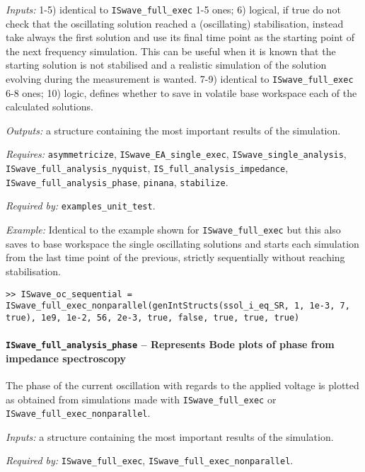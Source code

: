	\textit{Inputs:} 1-5) identical to \texttt{IS\-wave\_full\_exec} 1-5 ones;
	6) logical, if true do not check that the oscillating solution reached a
	(oscillating) stabilisation, instead take always the first solution
	and use its final time point as the starting point of the next
	frequency simulation. This can be useful when it is known that the
	starting solution is not stabilised and a realistic simulation of the
	solution evolving during the measurement is wanted.
	7-9) identical to \texttt{IS\-wave\_full\_exec} 6-8 ones;
	10) logic, defines whether to save in volatile base
	workspace each of the calculated solutions.

	\textit{Outputs:} a structure containing the most important results of the simulation.

	\textit{Requires:} \texttt{asymmetricize}, \texttt{IS\-wave\_EA\_single\_exec},
	\texttt{IS\-wave\_single\_analysis}, \texttt{IS\-wave\_full\_analysis\_nyquist},
	\texttt{IS\_full\_analysis\_impedance}, \texttt{IS\-wave\_full\_analysis\_phase}, \texttt{pinana},
	\texttt{stabilize}.

	\textit{Required by:} \texttt{examples\_unit\_test}.

	\textit{Example:} Identical to the example shown for \texttt{IS\-wave\_full\_exec} but this also saves to base workspace the single oscillating solutions and starts each simulation from the last time point of the previous, strictly sequentially without reaching stabilisation.
	\begin{lstlisting}[style=Matlab-editor]
>> ISwave_oc_sequential = ISwave_full_exec_nonparallel(genIntStructs(ssol_i_eq_SR, 1, 1e-3, 7, true), 1e9, 1e-2, 56, 2e-3, true, false, true, true, true)
\end{lstlisting}

	\paragraph{\texttt{IS\-wave\_full\_analysis\_phase} -- Represents Bode plots of phase from impedance spectroscopy}
	The phase of the current oscillation with regards to the applied voltage is plotted as obtained from simulations made with \texttt{IS\-wave\_full\_exec} or \texttt{IS\-wave\_full\_exec\_nonparallel}.


	\textit{Inputs:} a structure containing the most important results of the simulation.

	\textit{Required by:} \texttt{IS\-wave\_full\_exec}, \texttt{IS\-wave\_full\_exec\_nonparallel}.


